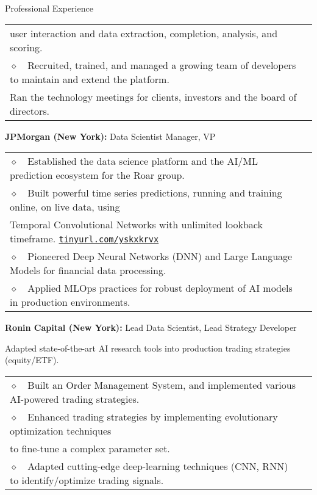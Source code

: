 \begin{rubric}{Professional Experience}
{\begin{tabular}{>{}l<{}@{\hspace{5pt}}%
    p{}}
      user interaction and data extraction, completion, analysis, and scoring. \\
      $\diamond$~~Recruited, trained, and managed a growing team of developers to maintain and extend the platform. \\
      Ran the technology meetings for clients, investors and the board of directors.
    \end{tabular}%
   }
%
\entry*[2018-2021]%
\textbf{JPMorgan (New York):} Data Scientist Manager, VP
\par
  {\renewcommand{\arraystretch}{1}%
    \begin{tabular}{>{}l<{}@{\hspace{5pt}}%
    p{}}
    $\diamond$~~Established the data science platform and the AI/ML prediction ecosystem for the Roar group. \\
    $\diamond$~~Built powerful time series predictions, running and training online, on live data, using \\
    Temporal Convolutional Networks with unlimited lookback timeframe. \href{http://tinyurl.com/yskxkrvx}{\texttt{tinyurl.com/yskxkrvx}}\\
    $\diamond$~~Pioneered Deep Neural Networks (DNN) and Large Language Models for financial data processing. \\
    $\diamond$~~Applied MLOps practices for robust deployment of AI models in production environments. \\
  \end{tabular}%
   }
%
\entry*[2015-2018]%
\textbf{Ronin Capital (New York):} Lead Data Scientist, Lead Strategy Developer
\par{Adapted state-of-the-art AI research tools into production trading strategies (equity/ETF).}
\par
  {\renewcommand{\arraystretch}{1}%
    \begin{tabular}{>{}l<{}@{\hspace{5pt}}%
    p{}}
      $\diamond$~~Built an Order Management System, and implemented various AI-powered trading strategies. \\
      $\diamond$~~Enhanced trading strategies by implementing evolutionary optimization techniques \\
      to fine-tune a complex parameter set. \\
      $\diamond$~~Adapted cutting-edge deep-learning techniques (CNN, RNN) to identify/optimize trading signals. \\

\end{tabular}}
\end{rubric}
